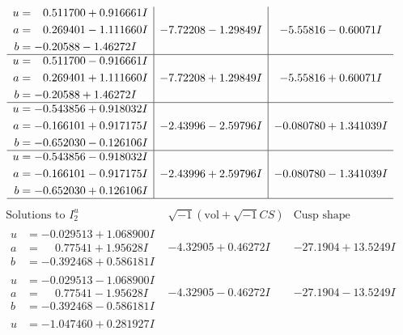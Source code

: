 \documentclass[1p]{elsarticle_modified}
\theoremstyle{definition}
\newcommand{\I}{\sqrt{-1}}
\begin{document}
$$\begin{array}{c|c|c}
\begin{aligned}
u &= \phantom{-}0.511700 + 0.916661 I \\
a &= \phantom{-}0.269401 - 1.111660 I \\
b &= -0.20588 - 1.46272 I\end{aligned}
 & -7.72208 - 1.29849 I & -5.55816 - 0.60071 I \\ \hline\begin{aligned}
u &= \phantom{-}0.511700 - 0.916661 I \\
a &= \phantom{-}0.269401 + 1.111660 I \\
b &= -0.20588 + 1.46272 I\end{aligned}
 & -7.72208 + 1.29849 I & -5.55816 + 0.60071 I \\ \hline\begin{aligned}
u &= -0.543856 + 0.918032 I \\
a &= -0.166101 + 0.917175 I \\
b &= -0.652030 - 0.126106 I\end{aligned}
 & -2.43996 - 2.59796 I & -0.080780 + 1.341039 I \\ \hline\begin{aligned}
u &= -0.543856 - 0.918032 I \\
a &= -0.166101 - 0.917175 I \\
b &= -0.652030 + 0.126106 I\end{aligned}
 & -2.43996 + 2.59796 I & -0.080780 - 1.341039 I\\
 \hline 
 \end{array}$$\newpage$$\begin{array}{c|c|c}  
\text{Solutions to }I^u_{2}& \I (\text{vol} + \sqrt{-1}CS) & \text{Cusp shape}\\
 \hline 
\begin{aligned}
u &= -0.029513 + 1.068900 I \\
a &= \phantom{-}0.77541 + 1.95628 I \\
b &= -0.392468 + 0.586181 I\end{aligned}
 & -4.32905 + 0.46272 I & -27.1904 + 13.5249 I \\ \hline\begin{aligned}
u &= -0.029513 - 1.068900 I \\
a &= \phantom{-}0.77541 - 1.95628 I \\
b &= -0.392468 - 0.586181 I\end{aligned}
 & -4.32905 - 0.46272 I & -27.1904 - 13.5249 I \\ \hline\begin{aligned}
u &= -1.047460 + 0.281927 I \\

\end{aligned}
\end{array}$$
\end{document}

